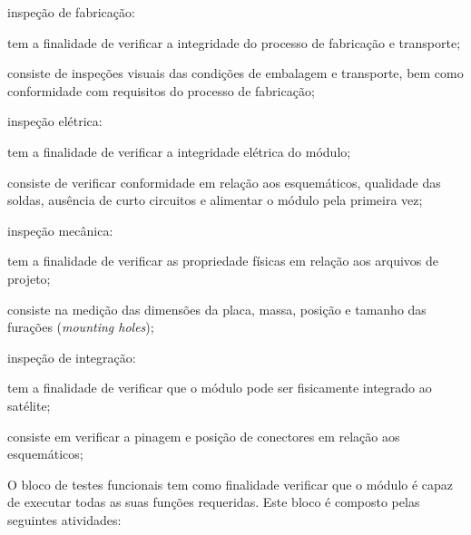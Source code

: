 \begin{alineas}
    \item inspeção de fabricação:
    \begin{alineas}
        \item tem a finalidade de verificar a integridade do processo de fabricação e transporte;
        \item consiste de inspeções visuais das condições de embalagem e transporte, bem como conformidade com requisitos do processo de fabricação;
    \end{alineas}

    \item inspeção elétrica:
    \begin{alineas}
        \item tem a finalidade de verificar a integridade elétrica do módulo;
        \item consiste de verificar conformidade em relação aos esquemáticos, qualidade das soldas, ausência de curto circuitos e alimentar o módulo pela primeira vez;
    \end{alineas}

    \item inspeção mecânica:
    \begin{alineas}
        \item tem a finalidade de verificar as propriedade físicas em relação aos arquivos de projeto;
        \item consiste na medição das dimensões da placa, massa, posição e tamanho das furações (\textit{mounting holes});
    \end{alineas}

    \item inspeção de integração:
    \begin{alineas}
        \item tem a finalidade de verificar que o módulo pode ser fisicamente integrado ao satélite;
        \item consiste em verificar a pinagem e posição de conectores em relação aos esquemáticos;
    \end{alineas}
\end{alineas}


O bloco de testes funcionais tem como finalidade verificar que o módulo é capaz de executar todas as suas funções requeridas.
Este bloco é composto pelas seguintes atividades:


